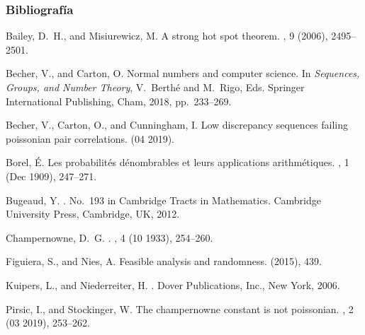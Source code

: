 \documentclass[10pt,mathserif]{beamer}%
\begin{document}
  
  \begin{frame}  
    \frametitle{Bibliografía}

  \begin{thebibliography}{1}
  
  \setlength{\parskip}{-0.5mm}
  {\tiny
    {\sc Bailey, D.~H., and Misiurewicz, M.}
    \newblock A strong hot spot theorem.
    , 9 (2006),
      2495--2501.
    
    {\sc Becher, V., and Carton, O.}
    \newblock Normal numbers and computer science.
    \newblock In {\em Sequences, Groups, and Number Theory}, V.~Berthé and
      M.~Rigo, Eds. Springer International Publishing, Cham, 2018, pp.~233--269.
    
    {\sc Becher, V., Carton, O., and Cunningham, I.}
    \newblock Low discrepancy sequences failing poissonian pair correlations.
     (04 2019).
    
    {\sc Borel, {\'E}.}
    \newblock Les probabilit{\'e}s d{\'e}nombrables et leurs applications
      arithm{\'e}tiques.
    , 1
      (Dec 1909), 247--271.
    
    {\sc Bugeaud, Y.}
    .
    \newblock No.~193 in Cambridge Tracts in Mathematics. Cambridge University
      Press, Cambridge, UK, 2012.
    
    {\sc Champernowne, D.~G.}
    .
    , 4 (10 1933),
      254--260.
    
    {\sc Figuiera, S., and Nies, A.}
    \newblock Feasible analysis and randomness.
     (2015), 439.
    
    {\sc Kuipers, L., and Niederreiter, H.}
    .
    \newblock Dover Publications, Inc., New York, 2006.
    
    {\sc Pirsic, I., and Stockinger, W.}
    \newblock The champernowne constant is not poissonian.
    , 2 (03 2019), 253--262.

}
\end{thebibliography}
\end{frame}
\end{document}
